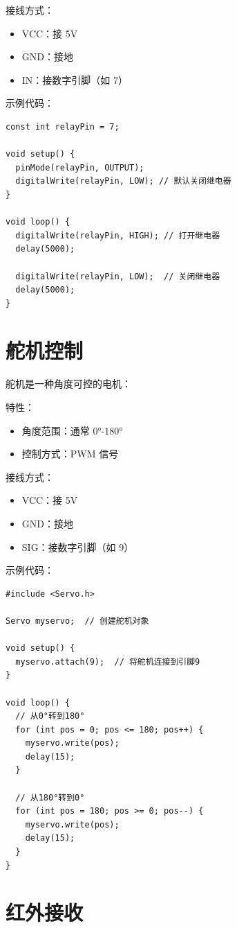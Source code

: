 \documentclass[12pt,UTF8]{ctexbook}
\begin{document}
接线方式：
\begin{itemize}
    \item VCC：接 5V
    \item GND：接地
    \item IN：接数字引脚（如 7）
\end{itemize}

示例代码：
\begin{lstlisting}
const int relayPin = 7;

void setup() {
  pinMode(relayPin, OUTPUT);
  digitalWrite(relayPin, LOW); // 默认关闭继电器
}

void loop() {
  digitalWrite(relayPin, HIGH); // 打开继电器
  delay(5000);
  
  digitalWrite(relayPin, LOW);  // 关闭继电器
  delay(5000);
}
\end{lstlisting}

\section{舵机控制}

舵机是一种角度可控的电机：

特性：
\begin{itemize}
    \item 角度范围：通常 0°-180°
    \item 控制方式：PWM 信号
\end{itemize}

接线方式：
\begin{itemize}
    \item VCC：接 5V
    \item GND：接地
    \item SIG：接数字引脚（如 9）
\end{itemize}

示例代码：
\begin{lstlisting}
#include <Servo.h>

Servo myservo;  // 创建舵机对象

void setup() {
  myservo.attach(9);  // 将舵机连接到引脚9
}

void loop() {
  // 从0°转到180°
  for (int pos = 0; pos <= 180; pos++) {
    myservo.write(pos);
    delay(15);
  }
  
  // 从180°转到0°
  for (int pos = 180; pos >= 0; pos--) {
    myservo.write(pos);
    delay(15);
  }
}
\end{lstlisting}

\section{红外接收}
\end{document}
